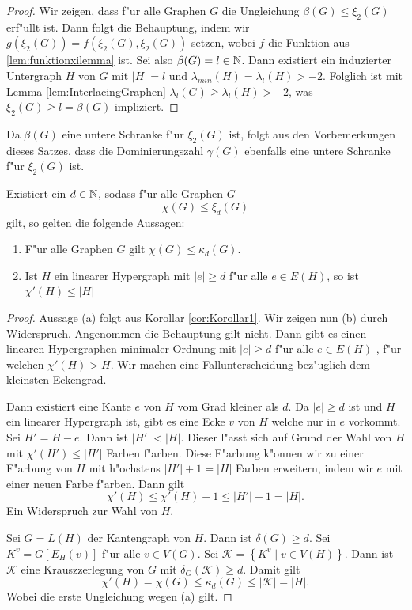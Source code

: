   \begin{proof}
    Wir zeigen, dass f"ur alle Graphen $G$ die Ungleichung $\beta(G) \leq \xi_{2}(G) $ erf"ullt ist. Dann folgt die Behauptung, indem wir $g(\xi_2(G))=f(\xi_2(G),\xi_2(G))$ setzen, wobei $f$ die Funktion aus \ref{lem:funktionxilemma} ist. Sei also $\beta(G) = l \in {\mathbb{N}}$. Dann existiert ein induzierter Untergraph $H$ von $G$ mit $|H| = l$ und $\lambda_{min}(H) = \lambda_{l}(H) > -2$. Folglich ist mit Lemma \ref{lem:InterlacingGraphen} $\lambda_l (G) \geq \lambda_{l}(H) > -2$, was $\xi_2(G) \geq l = \beta(G)$ impliziert.
  \end{proof}
  Da $\beta(G)$ eine untere Schranke f"ur $\xi_{2}(G)$ ist, folgt aus den Vorbemerkungen dieses Satzes, dass die Dominierungszahl $\gamma(G)$ ebenfalls eine untere Schranke f"ur $\xi_{2}(G)$ ist. 
  \begin{theorem}
    \label{thm:MainTheorem}
    Existiert ein $d\in {\mathbb{N}}$, sodass f"ur alle  Graphen $G$ $$\chi(G) \leq \xi_{d}(G)$$ gilt, so gelten die folgende Aussagen:
    \begin{enumerate}[label=\rm{(\alph*)}]
      \item F"ur alle Graphen $G$ gilt $\chi(G) \leq \kappa_d (G)$.
      \item  Ist $H$ ein linearer Hypergraph mit $\left|e\right| \geq d$ f"ur alle $e\in E(H)$, so ist $\chi'\left( H \right)\leq \left|H\right| $
    \end{enumerate}
  \end{theorem}

  \begin{proof}
    Aussage (a) folgt aus Korollar \ref{cor:Korollar1}.  
    Wir zeigen nun (b) durch Widerspruch. Angenommen die Behauptung gilt nicht. Dann gibt es einen linearen Hypergraphen minimaler Ordnung mit $|e| \geq d$ f"ur alle $e\in E(H)$ , f"ur welchen $\chi'(H) > H$. 
    Wir machen eine Fallunterscheidung bez"uglich dem kleinsten Eckengrad.

     Dann existiert eine Kante $e$ von $H$ vom Grad kleiner als $d$. Da $|e| \geq d$ ist und $H$ ein linearer Hypergraph ist, gibt es eine Ecke $v$ von $H$ welche nur in $e$ vorkommt. Sei $H'= H-e$. Dann ist $|H'| < |H|$. Dieser l"asst sich auf Grund der Wahl von $H$ mit $\chi'(H') \leq |H'|$ Farben f"arben. Diese F"arbung k"onnen wir zu einer F"arbung von $H$ mit h"ochstens $|H'|+1 = |H|$ Farben erweitern, indem wir $e$ mit einer neuen Farbe f"arben. Dann gilt 
    $$\chi'(H) \leq \chi'(H) +1  \leq |H'| +1 = |H| .$$ 
    Ein Widerspruch zur Wahl von $H$. 

     Sei $G=L(H)$ der Kantengraph von $H$. Dann ist $\delta(G) \geq d$. 
    Sei $K^{v} = G[E_{H}(v)]$ f"ur alle $v\in V(G)$. Sei $\mathcal{K}=\left\{ K^{v} \;|\; v \in V(H) \right\}$. 
    Dann ist $\mathcal{K}$ eine Krauszzerlegung von $G$ mit $\delta_{G}(\mathcal{K}) \geq d$. Damit gilt
    \begin{equation*}
      \chi'(H) = \chi(G) \leq \kappa_{d}(G) \leq |\mathcal{K}| = |H|.
    \end{equation*}
    Wobei die erste Ungleichung wegen (a) gilt. 
  \end{proof}

